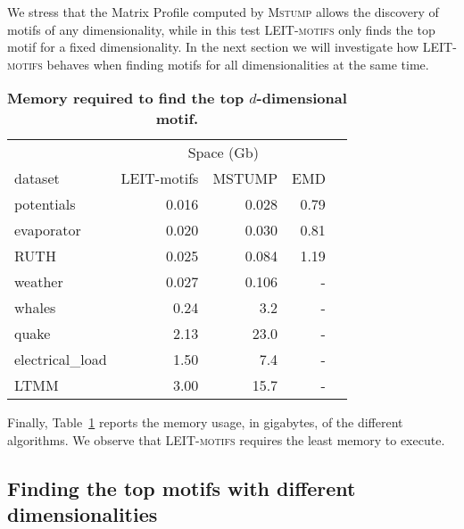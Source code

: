 We stress that the Matrix Profile computed by \textsc{Mstump} allows the discovery of motifs of any dimensionality, while in this test \textsc{LEIT-motifs} only finds the top motif for a fixed dimensionality. In the next section
we will investigate how \textsc{LEIT-motifs} behaves when finding motifs for all dimensionalities at the same time.

\begin{table}[t]
\caption{\textbf{Memory required to find the top $d$-dimensional motif.}}
\centering
\begin{tabular}{lrrrr}
\hline
& \multicolumn{3}{c}{Space (Gb)} & \\ \cline{2-4} 
dataset    & LEIT-motifs       & MSTUMP    & EMD \\ \hline
potentials &    \cellcolor[HTML]{CDF2D9}     0.016&        0.028&           0.79\\
evaporator &    \cellcolor[HTML]{CDF2D9}     0.020&        0.030&           0.81\\
RUTH & \cellcolor[HTML]{CDF2D9} 0.025&        0.084&           1.19\\
weather    &  \cellcolor[HTML]{CDF2D9}  0.027&       0.106&           -\\ 
whales    &  \cellcolor[HTML]{CDF2D9}  0.24&       3.2&           -\\ 
quake    &  \cellcolor[HTML]{CDF2D9}  2.13&       23.0&           -\\ 
electrical\_load    &  \cellcolor[HTML]{CDF2D9} 1.50      &    7.4     &     -      \\ 
LTMM    &  \cellcolor[HTML]{CDF2D9}  3.00&       15.7&           -\\
\hline
\end{tabular}
\label{tab:space}
\end{table}

Finally, Table~\ref{tab:space} reports the memory usage, in gigabytes, of the different algorithms.
We observe that \textsc{LEIT-motifs} requires the least memory to execute.


\subsection{Finding the top motifs with different dimensionalities}

